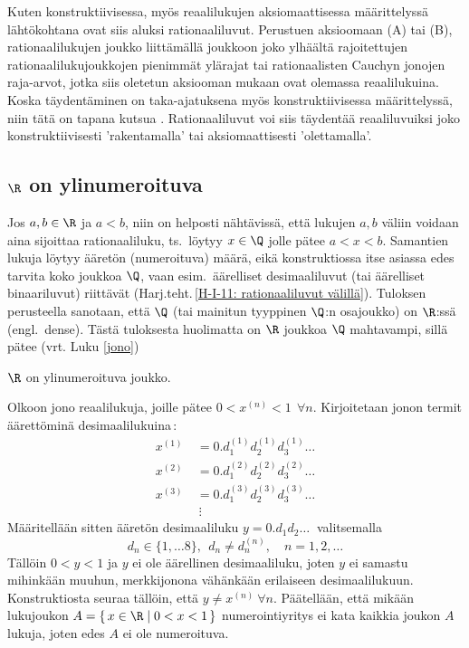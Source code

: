 Kuten konstruktiivisessa, myös reaalilukujen aksiomaattisessa määrittelyssä lähtökohtana ovat 
siis aluksi rationaaliluvut. Perustuen aksioomaan (A) tai (B), rationaalilukujen joukko 
 liittämällä joukkoon joko ylhäältä rajoitettujen rationaalilukujoukkojen 
pienimmät ylärajat tai rationaalisten Cauchyn jonojen raja-arvot, jotka siis oletetun aksiooman
mukaan ovat olemassa reaalilukuina. Koska täydentäminen on taka-ajatuksena myös
%
konstruktiivisessa määrittelyssä, niin tätä on tapana kutsua .
Rationaaliluvut voi siis täydentää reaaliluvuiksi joko konstruktiivisesti 'rakentamalla' tai
aksiomaattisesti 'olettamalla'.

\subsection{$\R$ on ylinumeroituva}
%

Jos $a,b \in \R$ ja $a<b$, niin on helposti nähtävissä, että lukujen $a,b$ väliin voidaan aina
sijoittaa rationaaliluku, ts.\ löytyy $x \in \Q$ jolle pätee $a<x<b$. Samantien lukuja löytyy
ääretön (numeroituva) määrä, eikä konstruktiossa itse asiassa edes tarvita koko joukkoa $\Q$,
vaan esim.\ äärelliset desimaaliluvut (tai äärelliset binaariluvut) riittävät
(Harj.teht.\,\ref{H-I-11: rationaaliluvut välillä}). Tuloksen perusteella sanotaan, että $\Q$
%
(tai mainitun tyyppinen $\Q$:n osajoukko) on $\R$:ssä  (engl.\ dense). Tästä 
tuloksesta huolimatta on $\R$ joukkoa $\Q$ mahtavampi, sillä pätee (vrt. Luku \ref{jono})
\begin{Lause} \label{R on ylinumeroituva} $\R$ on ylinumeroituva joukko. 
\end{Lause}
\tod Olkoon  jono reaalilukuja, joille pätee $0 < x^{(n)} < 1\ \ \forall n$. 
Kirjoitetaan jonon termit äärettöminä desimaalilukuina\,:
\begin{align*}
x^{(1)}\ &= 0.d_1^{(1)}d_2^{(1)}d_3^{(1)} \ldots \\
x^{(2)}\ &= 0.d_1^{(2)}d_2^{(2)}d_3^{(2)} \ldots \\
x^{(3)}\ &= 0.d_1^{(3)}d_2^{(3)}d_3^{(3)} \ldots \\
          &\ \vdots
\end{align*}
Määritellään sitten ääretön desimaaliluku $y = 0.d_1d_2 \ldots\ $ valitsemalla 
\[
d_n \in \{1,\ldots 8\},\ \ d_n \neq d_n^{(n)}, \quad n = 1,2, \ldots
\] 
Tällöin $0<y<1$ ja $y$ ei ole äärellinen desimaaliluku, joten $y$ ei samastu mihinkään muuhun,
merkkijonona vähänkään erilaiseen desimaalilukuun. Konstruktiosta seuraa tällöin, että 
$y \neq x^{(n)}\ \forall n$. Päätellään, että mikään lukujoukon 
$A = \{\,x \in \R \mid 0<x<1\,\}$ numerointiyritys ei kata kaikkia joukon $A$ lukuja, joten 
edes $A$ ei ole numeroituva. \loppu

